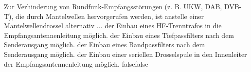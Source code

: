     {Zur Verhinderung von Rundfunk-Empfangsstörungen (z. B. UKW, DAB, DVB-T), die durch Mantelwellen hervorgerufen werden, ist anstelle einer Mantelwellendrossel alternativ ...}
    {der Einbau eines HF-Trenntrafos in die Empfangsantennenleitung möglich.}
    {der Einbau eines Tiefpassfilters nach dem Senderausgang möglich.}
    {der Einbau eines Bandpassfilters nach dem Senderausgang möglich.}
    {der Einbau einer seriellen Drosselspule in den Innenleiter der Empfangsantennenleitung möglich.}
    {false}{false}